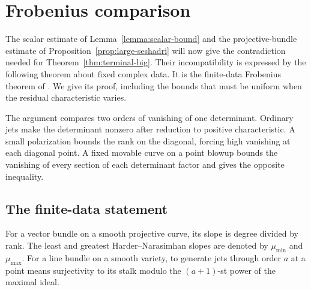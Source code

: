 \section{Frobenius comparison}
\label{sec:frobenius}

The scalar estimate of Lemma~\ref{lemma:scalar-bound} and the
projective-bundle estimate of Proposition~\ref{prop:large-seshadri}
will now give the contradiction needed for
Theorem~\ref{thm:terminal-big}.  Their incompatibility is expressed
by the following theorem about fixed complex data.  It is the
finite-data Frobenius theorem of \cite[Theorem~9.1]{LA}.
We give its proof, including the bounds that
must be uniform when the residual characteristic varies.

The argument compares two orders of vanishing of one determinant.
Ordinary jets make the determinant nonzero after reduction to positive
characteristic. A small polarization bounds the rank on the diagonal,
forcing high vanishing at each diagonal point. A fixed movable curve on a point
blowup bounds the vanishing of every section of each determinant
factor and gives the opposite inequality.

\subsection{The finite-data statement}

For a vector bundle on a smooth projective curve, its slope is
degree divided by rank. The least and greatest Harder--Narasimhan
slopes are denoted by $\mu_{\min}$ and $\mu_{\max}$.
For a line bundle on a smooth variety, to generate jets through
order $a$ at a point means surjectivity to its stalk modulo
the $(a+1)$-st power of the maximal ideal.

